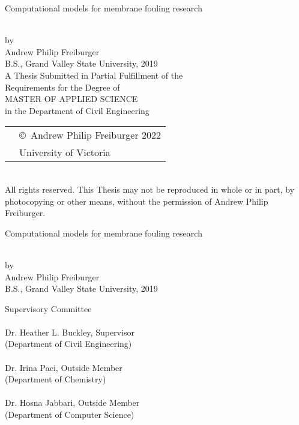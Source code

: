 \newcommand\thesistitle{
    Computational models for membrane fouling research
}
\newcommand\nameanddegrees{
Andrew Philip Freiburger\\
B.S., Grand Valley State University, 2019\\
}
\newcommand\panel{
    \HRule\\\panelist{Dr. Heather L. Buckley}{Supervisor}{Department of Civil Engineering}
    \HRule\\\panelist{Dr. Irina Paci}{Outside Member}{Department of Chemistry}
    \HRule\\\panelist{Dr. Hosna Jabbari}{Outside Member}{Department of Computer Science}
}

\newcommand\tpbreak{\\[\baselineskip]}
\newpage
\thispagestyle{empty}

\pagestyle{myheadings}

\pagebreak
{
    \centering
    \thesistitle
    \tpbreak
    
    by
    \tpbreak
    \nameanddegrees
    A Thesis Submitted in Partial Fulfillment of the \\
    Requirements for the Degree of
    \tpbreak
    MASTER OF APPLIED SCIENCE
    \tpbreak
    in the Department of Civil Engineering\\
    \vfill
    \begin{tabular}{cl}
        & \copyright\ Andrew Philip Freiburger 2022\\
        & \phantom{\copyright} University of Victoria
    \end{tabular}
    \tpbreak
    All rights reserved. This Thesis may not be reproduced in whole or in part, by \\
    \hfill photocopying or other means, without the permission of Andrew Philip Freiburger. 
    \hfill
}
\pagebreak

\newpage
{}
{
    \centering
    \thesistitle
    \tpbreak
    by
    \tpbreak
    \nameanddegrees
}
\newcommand\panelist[3]{\noindent #1, #2\\\noindent(#3)\tpbreak}
\vfill
\noindent Supervisory Committee
\tpbreak
\panel
\vfill
\pagebreak

